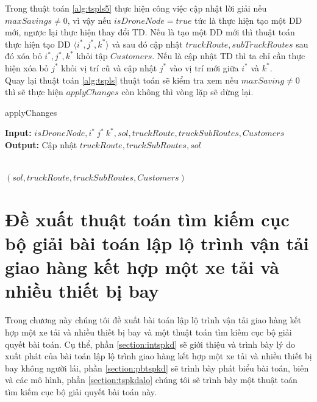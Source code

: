 \documentclass[a4paper,12pt]{report}
\begin{document}
Trong thuật toán \ref{alg:tspls5} thực hiện công việc cập nhật lời giải nếu $maxSavings \neq 0$, vì vậy nếu $isDroneNode=true $ tức là thực hiện tạo một \ac{DD} mới, ngược lại thực hiện thay đổi \ac{TD}. Nếu là tạo một \ac{DD} mới thì thuật toán thực hiện tạo \ac{DD} $\langle i^*,j^*,k^* \rangle$ và sau đó cập nhật $truckRoute,subTruckRoutes$ sau đó xóa bỏ $i^*,j^*,k^*$ khỏi tập $Customers$. Nếu là cập nhật \ac{TD} thì ta chỉ cần thực hiện xóa bỏ $j^*$ khỏi vị trí cũ và cập nhật $j^*$ vào vị trí mới giữa $i^*$ và $k^*$. \\

Quay lại thuật toán \ref{alg:tspls} thuật toán sẽ kiểm tra xem nếu $maxSaving \neq 0$ thì sẽ thực hiện $applyChanges$ còn không thì vòng lặp sẽ dừng lại.
\begin{algorithm}[H]
\caption{applyChanges}
\textbf{Input:} $isDroneNode,i^* \ j^* \ k^*,sol,truckRoute,truckSubRoutes,Customers$\\
\textbf{Output:} Cập nhật $truckRoute,truckSubRoutes,sol$\\
\begin{algorithmic}[1]
\Else 
{}
\EndIf
{} \\
\Return 	$(sol,truckRoute,truckSubRoutes,Customers)$
\end{algorithmic}

\label{alg:tspls5}
\end{algorithm}
\chapter{Đề xuất thuật toán tìm kiếm cục bộ  giải bài toán  lập lộ trình vận tải giao hàng kết hợp một xe tải và nhiều thiết bị bay}
\label{chapter:tspkd}
Trong chương này chúng tôi đề xuất bài toán lập lộ trình vận tải giao hàng kết hợp một xe tải và nhiều thiết bị bay và một thuật toán tìm kiếm cục bộ giải quyết bài toán. Cụ thể, phần \ref{section:intspkd} sẽ giới thiệu và trình bày lý do xuất phát của bài toán lập lộ trình giao hàng kết hợp một xe tải và  nhiều thiết bị bay không người lái, phần \ref{section:pbtspkd} sẽ trình bày phát biểu bài toán, biến và các mô hình, phần \ref{section:tspkdalo} chúng tôi sẽ trình bày một thuật toán tìm kiếm cục bộ giải quyết bài toán này.
\end{document}
